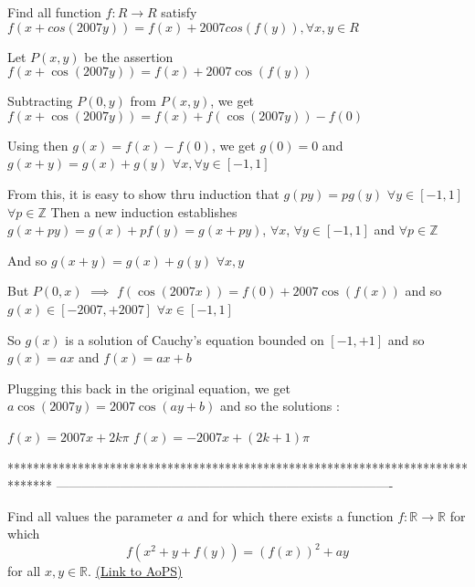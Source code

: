 \begin{solution}
	\begin{tcolorbox}Find all function $ f: R \to R$ satisfy $ f(x + cos(2007y)) = f(x) + 2007cos(f(y)), \forall x,y\in R$\end{tcolorbox}

Let $ P(x,y)$ be the assertion $ f(x + \cos(2007y)) = f(x) + 2007\cos(f(y))$

Subtracting $ P(0,y)$ from $ P(x,y)$, we get $ f(x + \cos(2007y)) = f(x) + f(\cos(2007y)) - f(0)$

Using then $ g(x) = f(x) - f(0)$, we get $ g(0) = 0$ and $ g(x + y) = g(x) + g(y)$ $ \forall x, \forall y\in[ - 1,1]$

From this, it is easy to show thru induction that $ g(py) = pg(y)$ $ \forall y\in[ - 1,1]$ $ \forall p\in\mathbb Z$
Then a new induction establishes $ g(x + py) = g(x) + pf(y) = g(x + py)$, $ \forall x$, $ \forall y\in[ - 1,1]$ and $ \forall p\in\mathbb Z$

And so $ g(x + y) = g(x) + g(y)$ $ \forall x,y$

But $ P(0,x)$ $ \implies$ $ f(\cos(2007x)) = f(0) + 2007\cos(f(x))$ and so $ g(x)\in[ - 2007, + 2007]$ $ \forall x\in[ - 1,1]$

So $ g(x)$ is a solution of Cauchy's equation bounded on $ [ - 1, + 1]$ and so $ g(x) = ax$ and $ f(x) = ax + b$

Plugging this back in the original equation, we get $ a\cos(2007y) = 2007\cos(ay + b)$ and so the solutions :

$ f(x) = 2007x + 2k\pi$
$ f(x) = -2007x + (2k+1)\pi$
\end{solution}
*******************************************************************************
-------------------------------------------------------------------------------

\begin{problem}
	Find all values the parameter $ a$ and for which there exists a function $f: \mathbb R \to \mathbb R$ for which
\[f(x^2+y+f(y))=(f(x))^2+ay\]
for all $x,y \in \mathbb R$.
	\flushright \href{https://artofproblemsolving.com/community/c6h314375}{(Link to AoPS)}
\end{problem}



